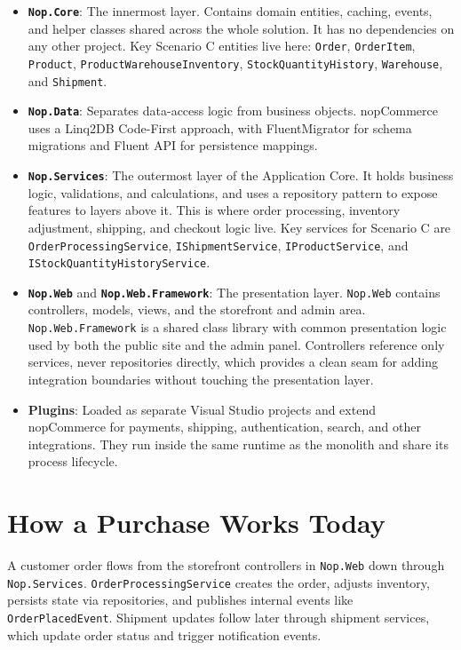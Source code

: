 \begin{itemize}
\item \textbf{\texttt{Nop.Core}}: The innermost layer. Contains domain entities, caching,
events, and helper classes shared across the whole solution. It has no dependencies on any
other project. Key Scenario C entities live here: \texttt{Order}, \texttt{OrderItem},
\texttt{Product}, \texttt{ProductWarehouseInventory}, \texttt{StockQuantityHistory},
\texttt{Warehouse}, and \texttt{Shipment}.

\item \textbf{\texttt{Nop.Data}}: Separates data-access logic from business objects.
nopCommerce uses a Linq2DB Code-First approach, with FluentMigrator for schema migrations and
Fluent API for persistence mappings.

\item \textbf{\texttt{Nop.Services}}: The outermost layer of the Application Core. It holds
business logic, validations, and calculations, and uses a repository pattern to expose
features to layers above it. This is where order processing, inventory adjustment, shipping,
and checkout logic live. Key services for Scenario C are \texttt{OrderProcessingService},
\texttt{IShipmentService}, \texttt{IProductService}, and \texttt{IStockQuantityHistoryService}.

\item \textbf{\texttt{Nop.Web}} and \textbf{\texttt{Nop.Web.Framework}}: The presentation
layer. \texttt{Nop.Web} contains controllers, models, views, and the storefront and admin
area. \texttt{Nop.Web.Framework} is a shared class library with common presentation logic
used by both the public site and the admin panel. Controllers reference only services, never
repositories directly, which provides a clean seam for adding integration boundaries without
touching the presentation layer.

\item \textbf{Plugins}: Loaded as separate Visual Studio projects and extend nopCommerce for
payments, shipping, authentication, search, and other integrations. They run inside the same
runtime as the monolith and share its process lifecycle.
\end{itemize}

\section{How a Purchase Works Today}

A customer order flows from the storefront controllers in \texttt{Nop.Web} down through
\texttt{Nop.Services}. \texttt{OrderProcessingService} creates the order, adjusts inventory,
persists state via repositories, and publishes internal events like \texttt{OrderPlacedEvent}.
Shipment updates follow later through shipment services, which update order status and trigger
notification events.

